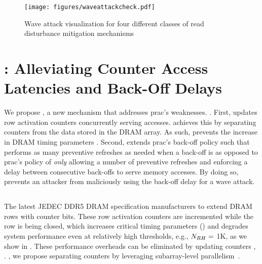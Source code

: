 \addtocounter{figure}{1}
\begin{figure*}[hb!]
\centering
\texttt{[image: figures/waveattackcheck.pdf]}
\caption{Wave attack visualization for four different classes of read disturbance mitigation mechanisms}
\label{fig:waveattackcheck}
\end{figure*}
\addtocounter{figure}{-2}

\section{\X{}: Alleviating Counter Access Latencies and Back-Off Delays}
\label{sec:mechanism}

We propose \X{}, a new mechanism that addresses \gls{prac}'s   weaknesses.
.
First,  updates row activation counters concurrently  serving accesses.
\X{} achieves this by  separating counters from the data stored in the DRAM array.
As such, \X{} prevents the increase in DRAM timing parameters .
Second,  extends \gls{prac}'s back-off policy such that \X{} performs as many preventive refreshes as needed when a back-off is  as opposed to \gls{prac}'s policy of \emph{only} allowing a  number of preventive refreshes and enforcing a delay between consecutive back-offs to serve memory accesses.
By doing so, \X{} prevents an attacker from maliciously using the back-off delay for a wave attack.

\subsection{}
The latest JEDEC DDR5 DRAM specification   manufacturers to extend DRAM rows with counter bits.
These row activation counters are incremented while the row is being closed, which increases critical  timing parameters () and degrades system performance even at relatively high  thresholds, e.g., $N_{RH}{} =$ 1K, as we show in .
These performance overheads can be eliminated by updating counters , .
, we propose  separating counters  by leveraging subarray-level parallelism~\cite{kim2012acase, chang2014improving, yaglikci2022hira, yuksel2024functionally}.

